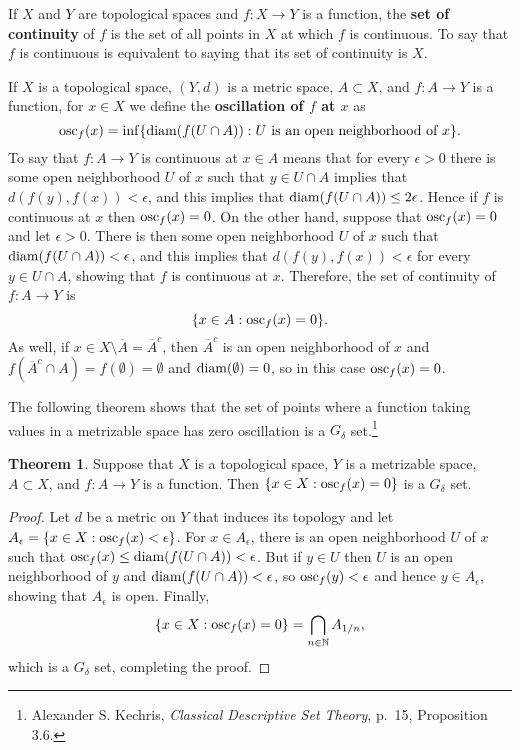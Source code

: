 \documentclass{article}
\newcommand{\diam}{\ensuremath\mathrm{diam}}
\newcommand{\osc}{\ensuremath\mathrm{osc}}
\theoremstyle{definition}
\newtheorem{theorem}{Theorem}
\theoremstyle{definition}
\begin{document}
If $X$ and $Y$ are topological spaces and $f:X \to Y$ is a function, the \textbf{set of continuity} of $f$ is the set of all points in $X$ at which $f$ is continuous.
To say that $f$ is continuous is equivalent to saying that its set of continuity is $X$.

If $X$ is a topological space, $(Y,d)$ is a metric space, $A \subset X$, and $f:A \to Y$ is a function, for $x \in X$ we define the \textbf{oscillation of $f$
at $x$} as
\[
\osc_f(x) = \inf\{ \diam(f(U \cap A)): \textrm{$U$ is an open neighborhood of $x$}\}.
\]
To say that $f:A \to Y$ is continuous at $x \in A$ means that for every $\epsilon>0$ there is some open neighborhood $U$ of $x$ such that
$y \in U \cap A$ implies that $d(f(y),f(x))<\epsilon$, and this implies that $\diam(f(U \cap A)) \leq 2\epsilon$. Hence if $f$ is continuous at $x$ then
$\osc_f(x)=0$. On the other hand, suppose that $\osc_f(x)=0$ and let $\epsilon>0$. There is then some open neighborhood $U$ of $x$
such that $\diam(f(U \cap A))<\epsilon$, and this implies that $d(f(y),f(x))<\epsilon$ for every $y \in U \cap A$, showing that $f$ is continuous at $x$.
Therefore, the set of continuity of $f:A \to Y$ is
\[
\{x \in A: \osc_f(x)=0\}.
\] 
As well, if $x \in X \setminus \overline{A}=\overline{A}^c$, then $\overline{A}^c$ is an open neighborhood of $x$ and $f(\overline{A}^c \cap A) = 
f(\emptyset)=\emptyset$ and $\diam(\emptyset)=0$, so in this case $\osc_f(x)=0$.


The following theorem shows that the set of points where a function taking values in a metrizable space 
has zero oscillation 
is a $G_\delta$ set.\footnote{Alexander S. Kechris, {\em Classical Descriptive Set Theory}, p.~15, Proposition 3.6.}

\begin{theorem}
Suppose that $X$ is a topological space, $Y$ is a metrizable space, $A \subset X$, and $f:A \to Y$ is a function. Then $\{x \in X: \osc_f(x)=0\}$ is a $G_\delta$ set.
\label{continuityset}
\end{theorem}
\begin{proof}
Let $d$ be a metric on $Y$ that induces its topology
and let $A_\epsilon=\{x \in X: \osc_f(x)<\epsilon\}$. For $x \in A_\epsilon$, there is an open neighborhood $U$ of $x$ such that
$\osc_f(x) \leq \diam(f(U \cap A))  < \epsilon$. But if $y \in U$ then $U$ is an open neighborhood of $y$ and $\diam(f(U \cap A))<\epsilon$, 
so $\osc_f(y) < \epsilon$ and hence $y \in A_\epsilon$, showing that $A_\epsilon$ is open.
Finally,
\[
\{x \in X: \osc_f(x)=0\} = \bigcap_{n \in \mathbb{N}} A_{1/n},
\]
which is a $G_\delta$ set, completing the proof.
\end{proof}
\end{document}
